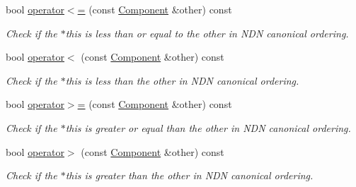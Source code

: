 \begin{DoxyCompactItemize}
bool \hyperlink{classndn_1_1name_1_1Component_a1c056dbd4993db2a92119d928c8aee22}{operator$<$=} (const \hyperlink{classndn_1_1name_1_1Component}{Component} \&other) const
\begin{DoxyCompactList}\small\item\em Check if the $\ast$this is less than or equal to the other in N\+DN canonical ordering. \end{DoxyCompactList}\item 
bool \hyperlink{classndn_1_1name_1_1Component_ae26e0637af302eff661e298ca1fb13c4}{operator$<$} (const \hyperlink{classndn_1_1name_1_1Component}{Component} \&other) const
\begin{DoxyCompactList}\small\item\em Check if the $\ast$this is less than the other in N\+DN canonical ordering. \end{DoxyCompactList}\item 
bool \hyperlink{classndn_1_1name_1_1Component_a7febeb332189c09afe05dd0f0b188ebf}{operator$>$=} (const \hyperlink{classndn_1_1name_1_1Component}{Component} \&other) const
\begin{DoxyCompactList}\small\item\em Check if the $\ast$this is greater or equal than the other in N\+DN canonical ordering. \end{DoxyCompactList}\item 
bool \hyperlink{classndn_1_1name_1_1Component_abac17ecbbd8c064ae8072fb38014797d}{operator$>$} (const \hyperlink{classndn_1_1name_1_1Component}{Component} \&other) const
\begin{DoxyCompactList}\small\item\em Check if the $\ast$this is greater than the other in N\+DN canonical ordering. \end{DoxyCompactList}\end{DoxyCompactItemize}
